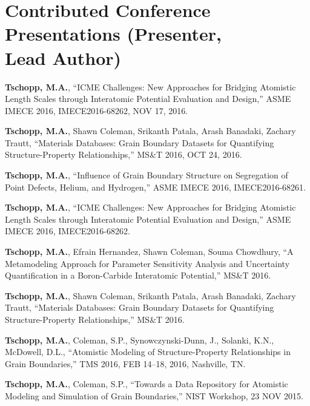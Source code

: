 \section{\sc Contributed Conference Presentations (Presenter, \\ Lead Author)}

\begin{cvlist}
\setlength{\itemsep}{0in}
\setlength{\parsep}{0in} 
\setlength{\parskip}{0in}
\setlength{\topsep}{0in} 
\setlength{\partopsep}{0in} 
\setlength{\leftmargin}{0.2in}

\item
\textbf{Tschopp, M.A.}, ``ICME Challenges: New Approaches for Bridging Atomistic Length Scales through Interatomic Potential Evaluation and Design,'' ASME IMECE 2016, IMECE2016-68262, NOV 17, 2016.

\item
\textbf{Tschopp, M.A.}, Shawn Coleman, Srikanth Patala, Arash Banadaki, Zachary Trautt, ``Materials Databases: Grain Boundary Datasets for Quantifying Structure-Property Relationships,'' MS\&T 2016, OCT 24, 2016.

\item
\textbf{Tschopp, M.A.}, ``Influence of Grain Boundary Structure on Segregation of Point Defects, Helium, and Hydrogen,'' ASME IMECE 2016, IMECE2016-68261.  

\item
\textbf{Tschopp, M.A.}, ``ICME Challenges: New Approaches for Bridging Atomistic Length Scales through Interatomic Potential Evaluation and Design,'' ASME IMECE 2016, IMECE2016-68262.

\item
\textbf{Tschopp, M.A.}, Efrain Hernandez, Shawn Coleman, Souma Chowdhury, ``A Metamodeling Approach for Parameter Sensitivity Analysis and Uncertainty Quantification in a Boron-Carbide Interatomic Potential,'' MS\&T 2016.

\item
\textbf{Tschopp, M.A.}, Shawn Coleman, Srikanth Patala, Arash Banadaki, Zachary Trautt, ``Materials Databases: Grain Boundary Datasets for Quantifying Structure-Property Relationships,'' MS\&T 2016.

\item
\textbf{Tschopp, M.A.}, Coleman, S.P., Synowczynski-Dunn, J., Solanki, K.N., McDowell, D.L., ``Atomistic Modeling of Structure-Property Relationships in Grain Boundaries,'' TMS 2016, FEB 14--18, 2016, Nashville, TN.

\item
\textbf{Tschopp, M.A.}, Coleman, S.P., ``Towards a Data Repository for Atomistic Modeling and Simulation of Grain Boundaries,'' NIST Workshop, 23 NOV 2015.


\end{cvlist}

